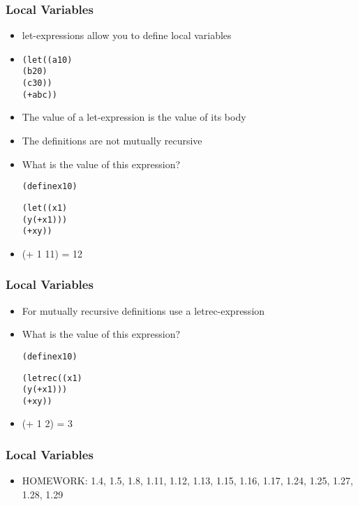 \documentclass{beamer}
\begin{document}
\begin{frame}[fragile]
\frametitle{Local Variables}
\begin{scriptsize}
\begin{itemize}
\item<1-> let-expressions allow you to define local variables

\item<1->
\begin{alltt}
(let ((a 10)
      (b 20)
      (c 30))
  (+ a b c))
\end{alltt}

\item<1-> The value of a let-expression is the value of its body

\item<2-> The definitions are not mutually recursive

\item<2-> What is the value of this expression?
\begin{alltt}
(define x 10)

(let ((x 1)
      (y (+ x 1)))
  (+ x y))
\end{alltt}

\item<3-> (+ 1 11) = 12

\end{itemize}
\end{scriptsize}
\end{frame}

\begin{frame}[fragile]
\frametitle{Local Variables}
\begin{scriptsize}
\begin{itemize}
\item<1-> For mutually recursive definitions use a letrec-expression

\item<2-> What is the value of this expression?
\begin{alltt}
(define x 10)

(letrec ((x 1)
         (y (+ x 1)))
  (+ x y))
\end{alltt}

\item<3-> (+ 1 2) = 3

\end{itemize}
\end{scriptsize}
\end{frame}

\begin{frame}[fragile]
\frametitle{Local Variables}
\begin{scriptsize}
\begin{itemize}
\item<1-> HOMEWORK: 1.4, 1.5, 1.8, 1.11, 1.12, 1.13, 1.15, 1.16, 1.17, 1.24, 1.25, 1.27, 1.28, 1.29

\end{itemize}
\end{scriptsize}
\end{frame}
\end{document}
